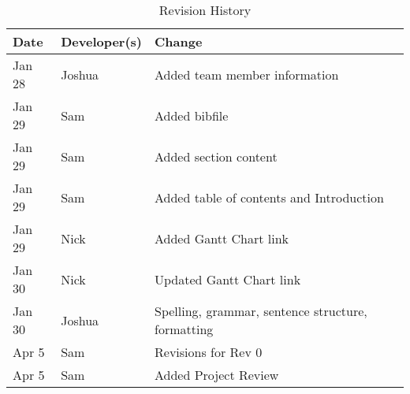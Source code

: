 \documentclass{article}
\begin{document}
\begin{table}[h]
\caption{Revision History} \label{TblRevisionHistory}
\begin{tabularx}{\textwidth}{lll}
\toprule
\textbf{Date} & \textbf{Developer(s)} & \textbf{Change}\\
\midrule
Jan 28 & Joshua & Added team member information\\
Jan 29 & Sam & Added bibfile\\
Jan 29 & Sam & Added section content\\
Jan 29 & Sam & Added table of contents and Introduction\\
Jan 29 & Nick & Added Gantt Chart link\\
Jan 30 & Nick & Updated Gantt Chart link\\
Jan 30 & Joshua & Spelling, grammar, sentence structure, formatting \\
\color{red}Apr 5&\color{red}Sam&\color{red}Revisions for Rev 0\\
\color{red}Apr 5&\color{red}Sam&\color{red}Added Project Review\\
\bottomrule
\end{tabularx}
\end{table}
\end{document}
